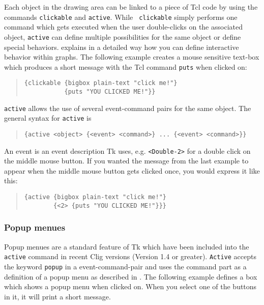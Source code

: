 Each object in the drawing area can be linked to a piece of {\sc Tcl}
code by using the commands {\tt clickable} and {\tt active}. While {\tt
clickable} simply performs one command which gets executed when the
user double-clicks on the associated object, {\tt active} can define
multiple possibilities for the same object or define special
behaviors. \cite{Konrad 95b} explains in a detailed way how you can
define interactive behavior within graphs. The following example
creates a mouse sensitive text-box which produces a short message with
the Tcl command {\tt puts} when clicked on:

\begin{quote}
\begin{verbatim}
{clickable {bigbox plain-text "click me!"} 
           {puts "YOU CLICKED ME!"}}
\end{verbatim}
\end{quote}

{\tt active} allows the use of several event-command pairs for the same
object. The general syntax for {\tt active} is 

\begin{quote}
\begin{verbatim}
{active <object> {<event> <command>} ... {<event> <command>}}
\end{verbatim}
\end{quote}

An event is an event description {\sc Tk} uses, e.g. \verb'<Double-2>'
for a double click on the middle mouse button. If you wanted the
message from the last example to appear when the middle mouse button
gets clicked once, you would express it like this: 

\begin{quote}
\begin{verbatim}
{active {bigbox plain-text "click me!"} 
        {<2> {puts "YOU CLICKED ME!"}}}
\end{verbatim}
\end{quote}

\subsubsection{Popup menues}

Popup menues are a standard feature of {\sc Tk} which have been
included into the {\tt active} command in recent {\sc Clig} versions
(Version 1.4 or greater). {\tt Active} accepts the keyword {\tt popup}
in a event-command-pair and uses the command part as a definition of a
popup menu as described in \cite{Ousterhout 94}. The following example
defines a box which shows a popup menu when clicked on. When you select
one of the buttons in it, it will print a short message.

